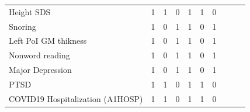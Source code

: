 \begin{table}[ht]
\begin{tabular}{lrrrrrrrrr}
  Height SDS &   1 &   1 &   0 &   1 &   1 &   0 &  &  &  \\ 
  Snoring &   1 &   0 &   1 &   1 &   0 &   1 &  &  &  \\ 
  Left PoI GM thikness &   1 &   0 &   1 &   1 &   0 &   1 &  &  &  \\ 
  Nonword reading &   1 &   0 &   1 &   1 &   0 &   1 &  &  &  \\ 
  Major Depression &   1 &   0 &   1 &   1 &   0 &   1 &  &  &  \\ 
  PTSD &   1 &   1 &   0 &   1 &   1 &   0 &  &  &  \\ 
  COVID19 Hospitalization (A1HOSP) &   1 &   1 &   0 &   1 &   1 &   0 &  &  &  \\ 
   \hline
\end{tabular}
\end{table}

